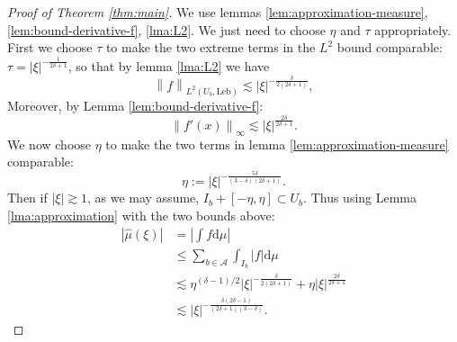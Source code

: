 \documentclass[12pt]{amsart}
\newcommand*\abs[1]{
	\left|#1\right|
}
\newcommand*\deriv{
	\mathrm{d}
}
\newcommand*\Leb{
	\mathrm{Leb}
}
\newcommand{\norm}[1]{\left\lVert#1\right\rVert}
\theoremstyle{definition}
\renewcommand{\leq}{\leqslant}
\begin{document}
\begin{proof}[Proof of Theorem \ref{thm:main}]
We use lemmas \ref{lem:approximation-measure}, \ref{lem:bound-derivative-f}, \ref{lma:L2}. We just need to choose $\eta$ and $\tau$ appropriately.
First we choose $\tau$ to make the two extreme terms in the $L^2$ bound comparable: $\tau = \abs{\xi}^{-\frac{1}{2\delta + 1}}$, so that by lemma \ref{lma:L2} we have
\[\norm{f}_{L^2(U_b, \Leb)} \lesssim \abs{\xi}^{-\frac{\delta}{2(2\delta + 1)}},\]
Moreover, by Lemma \ref{lem:bound-derivative-f}:
\[\norm{f'(x)}_\infty \lesssim \abs{\xi}^{\frac{2\delta}{2\delta + 1}}.\]
We now choose $\eta$ to make the two terms in lemma \ref{lem:approximation-measure} comparable:
\[\eta := \abs{\xi}^{-\frac{5\delta}{(3 - \delta)(2\delta + 1)}}.\]
Then if $\abs{\xi} \gtrsim 1$, as we may assume, $I_b + [-\eta, \eta] \subset U_b$. Thus using Lemma \ref{lma:approximation} with the two bounds above:
\begin{align*}
\abs{\hat{\mu}(\xi)}
&= \abs{\int f\deriv\mu}\\
&\leq\sum_{b\in\mathcal{A}} \int_{I_b} \abs{f}\deriv \mu \\
&\lesssim \eta^{(\delta - 1)/2}\abs{\xi}^{-\frac{\delta}{2(2\delta + 1)}} + \eta\abs{\xi}^{\frac{2\delta}{2\delta + 1}}\\ 
&\lesssim \abs{\xi}^{-\frac{\delta(2\delta - 1)}{(2\delta + 1)(3 - \delta)}}.
\end{align*}
\end{proof}

\end{document}
